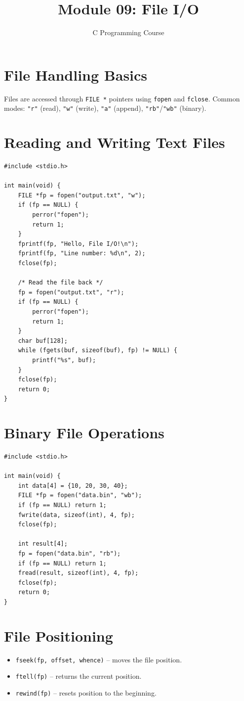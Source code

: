 \documentclass[11pt,a4paper]{article}
\title{Module 09: File I/O}
\author{C Programming Course}
\date{}
\begin{document}
\maketitle
\thispagestyle{fancy}

\section{File Handling Basics}
Files are accessed through \texttt{FILE *} pointers using \texttt{fopen} and
\texttt{fclose}. Common modes: \texttt{"r"} (read), \texttt{"w"} (write),
\texttt{"a"} (append), \texttt{"rb"}/\texttt{"wb"} (binary).

\section{Reading and Writing Text Files}
\begin{lstlisting}
#include <stdio.h>

int main(void) {
    FILE *fp = fopen("output.txt", "w");
    if (fp == NULL) {
        perror("fopen");
        return 1;
    }
    fprintf(fp, "Hello, File I/O!\n");
    fprintf(fp, "Line number: %d\n", 2);
    fclose(fp);

    /* Read the file back */
    fp = fopen("output.txt", "r");
    if (fp == NULL) {
        perror("fopen");
        return 1;
    }
    char buf[128];
    while (fgets(buf, sizeof(buf), fp) != NULL) {
        printf("%s", buf);
    }
    fclose(fp);
    return 0;
}
\end{lstlisting}

\section{Binary File Operations}
\begin{lstlisting}
#include <stdio.h>

int main(void) {
    int data[4] = {10, 20, 30, 40};
    FILE *fp = fopen("data.bin", "wb");
    if (fp == NULL) return 1;
    fwrite(data, sizeof(int), 4, fp);
    fclose(fp);

    int result[4];
    fp = fopen("data.bin", "rb");
    if (fp == NULL) return 1;
    fread(result, sizeof(int), 4, fp);
    fclose(fp);
    return 0;
}
\end{lstlisting}

\section{File Positioning}
\begin{itemize}
  \item \texttt{fseek(fp, offset, whence)} -- moves the file position.
  \item \texttt{ftell(fp)} -- returns the current position.
  \item \texttt{rewind(fp)} -- resets position to the beginning.
\end{itemize}
\end{document}
